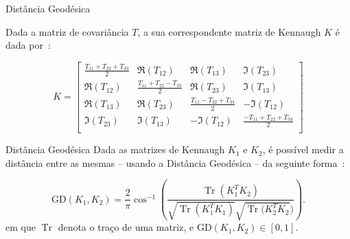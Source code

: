 \documentclass{beamer} %
\newcommand{\Tr}{\operatorname{Tr}}
\begin{document}
\begin{frame}{Distância Geodésica}

Dada a matriz de covariância $T$, a sua correspondente matriz de Kennaugh $K$ é dada por~\cite{ClassificationPolSARGeodesic}:


\scriptsize
\begin{equation}
K =
\begin{bmatrix}
\frac{ T_{11} + T_{22} + T_{33} }{2} & \Re(T_{12}) & \Re(T_{13}) & \Im(T_{23})\\
\Re(T_{12}) & \frac{T_{11} + T_{22} - T_{33}}{2} & \Re(T_{23}) & \Im(T_{13})\\
\Re(T_{13}) & \Re(T_{23}) & \frac{ T_{11} - T_{22} + T_{33} }{2} & -\Im(T_{12})\\
\Im(T_{23}) & \Im(T_{13}) & -\Im(T_{12}) & \frac{ -T_{11} + T_{22} + T_{33} }{2}\\
\end{bmatrix}
\end{equation}

\normalsize
    
\end{frame}

\begin{frame}{Distância Geodésica}
    Dada as matrizes de Kennaugh $K_1$ e $K_2$, é possível medir a distância entre as mesmas -- usando a Distância Geodésica -- da seguinte forma~\cite{ClassificationPolSARGeodesic}:
    
\begin{equation}
\text{GD}(K_1, K_2) = \frac{2}{\pi} \cos^{-1} \left(\frac{\Tr(K_1^T K_2)}{\sqrt{\Tr(K_1^T K_1)} \sqrt{\Tr(K_2^T K_2})} \right).
\end{equation}
em que $\Tr$ denota o traço de uma matriz, e $\text{GD}(K_1, K_2) \in [0,1]$.
    
\end{frame}
\end{document}
